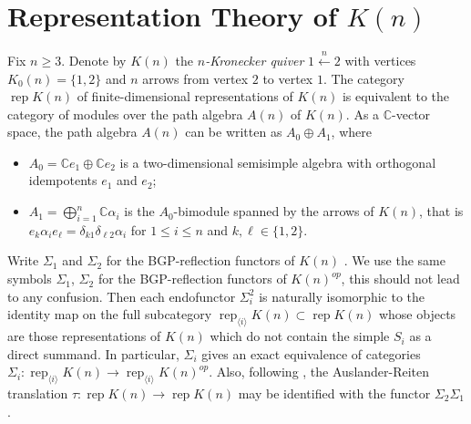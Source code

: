 \documentclass{amsart}
\numberwithin{equation}{section}
\newcommand{\rep}{\operatorname{rep}}
\newcommand{\CC}{\mathbb{C}}
\begin{document}
\section{Representation Theory of $K(n)$}
\label{sec:RepK(n)}

Fix $n\ge3$. Denote by $K(n)$ the \emph{$n$-Kronecker quiver} $1\stackrel{n}{\longleftarrow}2$ with vertices $K_0(n)=\{1,2\}$ and $n$ arrows from vertex $2$ to vertex $1$. 
The category $\rep K(n)$ of finite-dimensional representations of $K(n)$ is equivalent to the category of modules over the path algebra $A(n)$ of $K(n)$.
As a $\CC$-vector space, the path algebra $A(n)$ can be written as $A_0\oplus A_1$, where 
\begin{itemize}
  \item $A_0=\CC e_1\oplus \CC e_2$ is a two-dimensional semisimple algebra with orthogonal idempotents $e_1$ and $e_2$;
  \item $A_1=\bigoplus_{i=1}^n \CC\alpha_i$ is the $A_0$-bimodule spanned by the arrows of $K(n)$, that is $e_k\alpha_ie_\ell=\delta_{k1}\delta_{\ell2}\alpha_i$ for $1\le i\le n$ and $k,\ell\in\{1,2\}$.
\end{itemize}

Write $\Sigma_1$ and $\Sigma_2$ for the BGP-reflection functors of $K(n)$ \cite{bgp}. 
We use the same symbols $\Sigma_1$, $\Sigma_2$ for the BGP-reflection functors of $K(n)^{op}$, this should not lead to any confusion. 
Then each endofunctor $\Sigma_i^2$ is naturally isomorphic to the identity map on the full subcategory $\rep_{\langle i\rangle} K(n)\subset \rep K(n)$ whose objects are those representations of $K(n)$ which do not contain the simple $S_i$ as a direct summand.
In particular, $\Sigma_i$ gives an exact equivalence of categories $\Sigma_i:\rep_{\langle i\rangle} K(n)\to\rep_{\langle i\rangle} K(n)^{op}$.
Also, following \cite{brenner-butler}, the Auslander-Reiten translation $\tau:\rep K(n)\to\rep K(n)$ may be identified with the functor $\Sigma_2\Sigma_1$.
\end{document}

